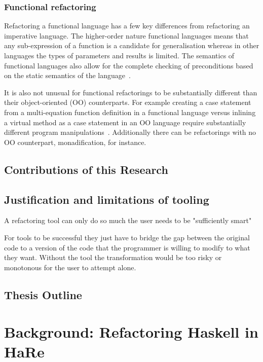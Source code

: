 \subsection{Functional refactoring}

Refactoring a functional language has a few key differences from refactoring an imperative language. The higher-order nature functional languages means that any sub-expression of a function is a candidate for generalisation whereas in other languages the types of parameters and results is limited. The semantics of functional languages also allow for the complete checking of preconditions based on the static semantics of the language~\citep{refacTools}.

It is also not unusual for functional refactorings to be substantially different than their object-oriented (OO) counterparts. For example creating a case statement from a multi-equation function definition in a functional language versus inlining a virtual method as a case statement in an OO language require substantially different program manipulations~\citep{huiqingThesis}. Additionally there can be refactorings with no OO counterpart, monadification, for instance.  

\section{Contributions of this Research}


\section{Justification and limitations of tooling}

A refactoring tool can only do so much the user needs to be "sufficiently smart" 

For tools to be successful they just have to bridge the gap between the original code to a version of the code that the programmer is willing to modify to what they want. Without the tool the transformation would be too risky or monotonous for the user to attempt alone.

  

\section{Thesis Outline}



\chapter{Background: Refactoring Haskell in HaRe}
\label{hare}

